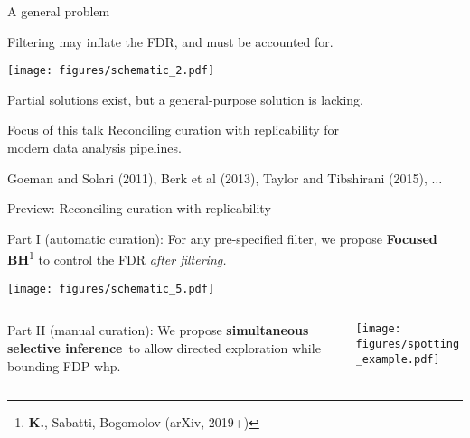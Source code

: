 \documentclass{beamer}
\begin{document}
\begin{frame}{A general problem}
	
	Filtering may inflate the FDR, and must be accounted for.
	\vspace{0.1in}
	
	\texttt{[image: figures/schematic\_2.pdf]}

\vspace{0.1in}

Partial solutions exist, but a general-purpose solution is lacking. 

\vspace{0.1in}

\begin{block}{Focus of this talk}
	Reconciling curation with replicability for \\ modern data analysis pipelines.
\end{block}
\vspace{0.1in}

Goeman and Solari (2011), Berk et al (2013), Taylor and Tibshirani (2015), $\dots$

\end{frame}

\begin{frame}{Preview: Reconciling curation with replicability}
		
	\textcolor{beamer@blendedblue}{Part I (automatic curation):} For any {\color{blue} pre-specified} filter, we propose \textbf{Focused BH}\footnote{\textbf{K.}, Sabatti, Bogomolov (arXiv, 2019+)} to control the FDR \textit{after filtering.}

	\begin{center}
	\texttt{[image: figures/schematic\_5.pdf]}
	\end{center}
	\vspace{-0.3 in}
		
		\pause 
	\begin{columns}
		\begin{column}{0.4\textwidth}
				\textcolor{beamer@blendedblue}{Part II (manual curation):} We propose \textbf{simultaneous selective inference}\footnotemark \ to allow directed exploration while bounding FDP whp.
		\end{column}
		\begin{column}{0.5\textwidth}
			\vspace{0.15in}
			\begin{center}
				\texttt{[image: figures/spotting\_example.pdf]}
			\end{center}
		\end{column}
	\end{columns}
\vspace{-0.1in}


	
\end{frame}
\end{document}
